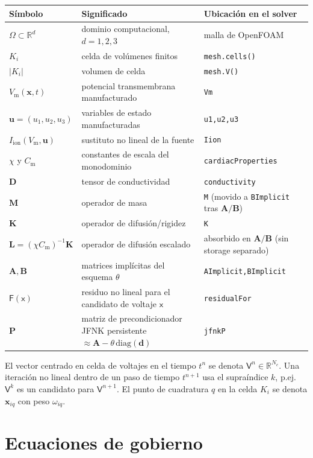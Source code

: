 \documentclass[11pt,a4paper]{article}
\newcommand{\code}[1]{\texttt{\small #1}}
\newcommand{\Vm}{V_{\text{m}}}
\newcommand{\Iion}{I_{\mathrm{ion}}}
\newcommand{\Dten}{\mathbf{D}}
\newcommand{\Mmass}{\mathbf{M}}
\newcommand{\Kstif}{\mathbf{K}}
\newcommand{\Lop}{\mathbf{L}}
\newcommand{\Aimp}{\mathbf{A}}
\newcommand{\Bimp}{\mathbf{B}}
\newcommand{\Fres}{\mathsf{F}}
\newcommand{\R}{\mathbb{R}}
\begin{document}
\begin{center}
\footnotesize
\begin{tabular}{@{}lll@{}}
\toprule
Símbolo & Significado & Ubicación en el solver \\
\midrule
$\Omega\subset\R^d$ & dominio computacional, $d=1,2,3$ & malla de OpenFOAM \\
$K_i$ & celda de volúmenes finitos & \code{mesh.cells()} \\
$|K_i|$ & volumen de celda & \code{mesh.V()} \\
$\Vm(\mathbf{x},t)$ & potencial transmembrana manufacturado & \code{Vm} \\
$\mathbf{u}=(u_1,u_2,u_3)$ & variables de estado manufacturadas & \code{u1,u2,u3} \\
$\Iion(\Vm,\mathbf{u})$ & sustituto no lineal de la fuente & \code{Iion} \\
$\chi$ y $C_{\text{m}}$ & constantes de escala del monodominio & \code{cardiacProperties} \\
$\Dten$ & tensor de conductividad & \code{conductivity} \\
$\Mmass$ & operador de masa & \code{M} (movido a \code{BImplicit} tras $\Aimp/\Bimp$) \\
$\Kstif$ & operador de difusión/rigidez & \code{K} \\
$\Lop=(\chi C_{\text{m}})^{-1}\Kstif$ & operador de difusión escalado & absorbido en $\Aimp/\Bimp$ (sin storage separado) \\
$\Aimp,\Bimp$ & matrices implícitas del esquema $\theta$ & \code{AImplicit,BImplicit} \\
$\Fres(\mathsf{x})$ & residuo no lineal para el candidato de voltaje $\mathsf{x}$ & \code{residualFor} \\
$\mathbf{P}$ & matriz de precondicionador JFNK persistente $\approx\Aimp-\theta\,\mathrm{diag}(\mathbf{d})$ & \code{jfnkP} \\
\bottomrule
\end{tabular}
\end{center}

El vector centrado en celda de voltajes en el tiempo $t^n$ se denota $\mathsf{V}^n\in\R^{N_c}$.
Una iteración no lineal dentro de un paso de tiempo $t^{n+1}$ usa el supraíndice $k$, p.ej.\
$\mathsf{V}^k$ es un candidato para $\mathsf{V}^{n+1}$. El punto de cuadratura $q$ en la celda
$K_i$ se denota $\mathbf{x}_{iq}$ con peso $\omega_{iq}$.

\section{Ecuaciones de gobierno}
\end{document}
